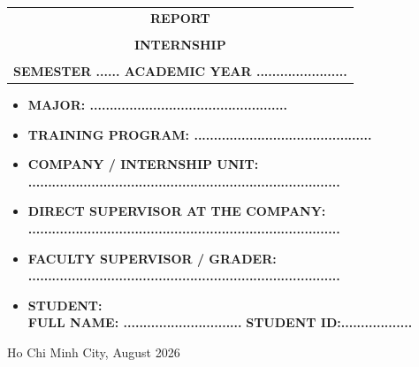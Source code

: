 \documentclass[a4paper]{article}
\begin{document}
\begin{titlepage}
\begin{center}
\begin{tabular}{c}
\multicolumn{1}{c}{\textbf{{\LARGE REPORT}}}\\
\\{\textbf{{\LARGE INTERNSHIP}}}
\\
\\
\textbf{\Large SEMESTER ...... ACADEMIC YEAR .......................} \\
\end{tabular}
\end{center}
\vspace{0.5cm}
\begin{itemize}
\renewcommand\labelitemi{--}
    \item \Large \textbf{MAJOR: ..................................................}
    \item \Large \textbf{TRAINING PROGRAM: .............................................}
\end{itemize}
\vspace{0.7cm}
\begin{itemize}
\renewcommand\labelitemi{--}
    \item \Large \textbf{COMPANY / INTERNSHIP UNIT:}
    \\ \Large \textbf{...............................................................................}
    \item \Large \textbf{DIRECT SUPERVISOR AT THE COMPANY:}
    \\ \Large \textbf{...............................................................................}
    \item \Large \textbf{FACULTY SUPERVISOR / GRADER:}
    \\ \Large \textbf{...............................................................................}
    \item \Large \textbf{STUDENT:}
    \\ \Large \textbf{FULL NAME: ..............................} \textbf{STUDENT ID:..................}
\end{itemize}
\vspace{0.5cm}
\begin{center}
{\Large Ho Chi Minh City, August 2026}
\end{center}
\end{titlepage}

\newpage
\tableofcontents
\newpage




\end{document}
